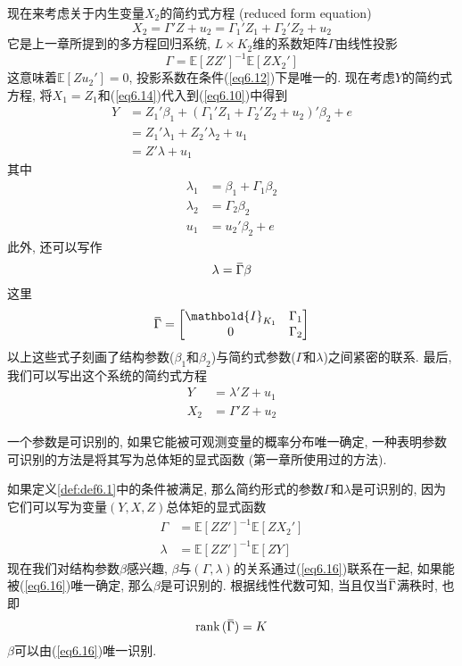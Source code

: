 \documentclass[cn, 12pt, math=mtpro2, bibstyle=apa, blue, twocol]{elegantbook}
\newcommand{\E}{\mathbb{E}}
\newcommand{\overbar}[1]{\mkern 1.5mu\overline{\mkern-1.5mu#1\mkern-1.5mu}\mkern 1.5mu}
\begin{document}
现在来考虑关于内生变量$X_2$的简约式方程 (reduced form equation)
\begin{equation}\label{eq6.14}
  X_2=\Gamma'Z+u_2=\Gamma_1'Z_1+\Gamma_2'Z_2+u_2
\end{equation}
它是上一章所提到的多方程回归系统, $L\times K_2$维的系数矩阵$\Gamma$由线性投影
\begin{equation}\label{eq6.15}
  \Gamma=\E[ZZ']^{-1}\E[ZX_2']
\end{equation}
这意味着$\E[Zu_2']=0$, 投影系数在条件(\ref{eq6.12})下是唯一的. 现在考虑$Y$的简约式方程, 将$X_1=Z_1$和(\ref{eq6.14})代入到(\ref{eq6.10})中得到
\begin{align*}
Y&=Z_1'\beta_1+(\Gamma_1'Z_1+\Gamma_2'Z_2+u_2)'\beta_2+e \\
&=Z_1'\lambda_1+Z_2'\lambda_2+u_1 \\
&=Z'\lambda+u_1
\end{align*}
其中
\begin{align*}
\lambda_1&=\beta_1+\Gamma_1\beta_2 \\
\lambda_2&=\Gamma_2\beta_2 \\
u_1&=u_2'\beta_2+e
\end{align*}
此外, 还可以写作
\begin{equation}\label{eq6.16}
  \lambda=\overbar{\Gamma}\beta
\end{equation}
这里
$$\overbar{\Gamma}=\begin{bmatrix}
                     \mathbold{I}_{K_1} & \Gamma_1 \\
                     0 & \Gamma_2
                   \end{bmatrix}$$
以上这些式子刻画了结构参数($\beta_1$和$\beta_2$)与简约式参数($\Gamma$和$\lambda$)之间紧密的联系. 最后, 我们可以写出这个系统的简约式方程
\begin{align*}
Y&=\lambda'Z+u_1 \\
X_2&=\Gamma'Z+u_2
\end{align*}

一个参数是可识别的, 如果它能被可观测变量的概率分布唯一确定, 一种表明参数可识别的方法是将其写为总体矩的显式函数 (第一章所使用过的方法).

如果定义\ref{def:def6.1}中的条件被满足, 那么简约形式的参数$\Gamma$和$\lambda$是可识别的, 因为它们可以写为变量$(Y,X,Z)$总体矩的显式函数
\begin{align}
\Gamma&=\E[ZZ']^{-1}\E[ZX_2'] \label{eq6.18} \\
\lambda&=\E[ZZ']^{-1}\E[ZY] \label{eq6.19}
\end{align}
现在我们对结构参数$\beta$感兴趣, $\beta$与$(\Gamma,\lambda)$的关系通过(\ref{eq6.16})联系在一起, 如果能被(\ref{eq6.16})唯一确定, 那么$\beta$是可识别的. 根据线性代数可知, 当且仅当$\overbar{\Gamma}$满秩时, 也即
\begin{equation}\label{eq6.17}
  \text{rank}\,(\overbar{\Gamma})=K
\end{equation}
$\beta$可以由(\ref{eq6.16})唯一识别.
\end{document}
